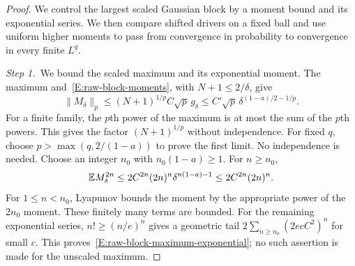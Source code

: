 \begin{proof}
  We control the largest scaled Gaussian block by a moment bound and its
  exponential series. We then compare shifted drivers on a fixed ball and use
  uniform higher moments to pass from convergence in probability to
  convergence in every finite $L^q$.


  \medskip
  \noindent\textit{Step 1.~}We bound the scaled maximum and its exponential
  moment.
  The maximum and~\eqref{E:raw-block-moments}, with $N+1 \le 2/\delta$, give
  \[
    \|M_\delta\|_p
    \le (N+1)^{1/p}C\sqrt p\,g_\delta
    \le C'\sqrt p\,\delta^{(1-a)/2-1/p}.
  \]
  For a finite family, the $p$th power of the maximum is at most the sum of
  the $p$th powers. This gives the factor $(N+1)^{1/p}$ without independence.
  For fixed $q$, choose $p > \max(q,2/(1-a))$ to prove the first limit. No
  independence is needed. Choose an integer $n_0$ with $n_0(1-a) \ge 1$. For $n
  \ge n_0$,
  \[
    \mathbb{E} M_\delta^{2n}
    \le2C^{2n}(2n)^n\delta^{n(1-a)-1}
    \le2C^{2n}(2n)^n.
  \]
  For $1 \le n < n_0$, Lyapunov bounds the moment by the appropriate power of
  the $2n_0$ moment. These finitely many terms are bounded. For the remaining
  exponential series, $n! \ge (n/e)^n$ gives a geometric tail $2\sum_{n\ge
  n_0}(2ecC^2)^n$ for small $c$. This
  proves~\eqref{E:raw-block-maximum-exponential}; no such assertion is made for
  the unscaled maximum.



\end{proof}
